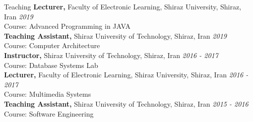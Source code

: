 \documentclass{resume} %
\begin{document}
\begin{rSection}{Teaching}
{\bf Lecturer,}{ Faculty of Electronic Learning, Shiraz University, Shiraz, Iran} \hfill {\em 2019} 
\\ Course: Advanced Programming in JAVA\\
{\bf Teaching Assistant,}{ Shiraz University of Technology, Shiraz, Iran} \hfill {\em  2019} 
\\ Course: Computer Architecture
\\{\bf Instructor,}{ Shiraz University of Technology, Shiraz, Iran} \hfill {\em 2016 - 2017} 
\\ Course: Database Systems Lab
\\{\bf Lecturer,}{ Faculty of Electronic Learning, Shiraz University, Shiraz, Iran} \hfill {\em 2016 - 2017} 
\\ Course: Multimedia Systems
\\{\bf Teaching Assistant,}{ Shiraz University of Technology, Shiraz, Iran} \hfill {\em 2015 - 2016} 
\\ Course: Software Engineering

\end{rSection}
\end{document}
